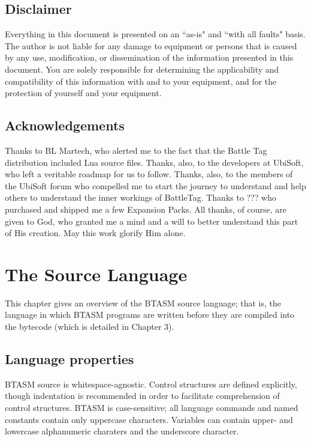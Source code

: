 \documentclass[12pt,a4paper]{scrbook}
\begin{document}
\section*{Disclaimer}

Everything in this document is presented on an ``as-is" and ``with all faults" basis.  The 
author is not liable
for any damage to equipment or persons that is caused by any use, modification, or 
dissemination of the information presented in this document.  You
are solely responsible for determining the applicability and compatibility of this
information with and to your equipment, and for the protection of yourself and your 
equipment.

\section*{Acknowledgements}

Thanks to BL Martech, who alerted me to the fact that the Battle Tag distribution included
Lua source files.  Thanks, also, to the developers at UbiSoft, who left a veritable roadmap for
us to follow.  
Thanks, also, to the members of the UbiSoft forum who compelled me to start the journey to understand
and help others to understand the inner workings of BattleTag.
Thanks to ??? who purchased and shipped me a few Expansion Packs.
All thanks, of course, are given to God, who granted me a mind and a will to better
understand this part of His creation.  May this work glorify Him alone.


\rohead {\thepage}
\lohead {\rightmark}
\rehead {\leftmark}
\lehead {\thepage}

\mainmatter

\chapter{The Source Language}

This chapter gives an overview of the BTASM source language; that is, the language in which
BTASM programs are written before they are compiled into the bytecode (which is detailed in 
Chapter 3).

\section{Language properties}

BTASM source is whitespace-agnostic.  Control structures are defined explicitly, though indentation 
is
recommended in order to facilitate comprehension of control structures.  BTASM is case-sensitive;
all language commands and named constants contain only uppercase characters.  
Variables can contain upper- and lowercase alphanumeric charaters and the underscore character.
\end{document}
